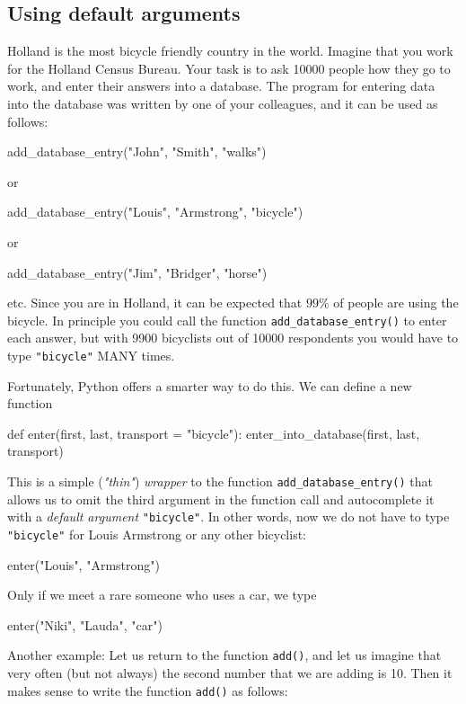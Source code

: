 \subsection{Using default arguments}

Holland is the most bicycle friendly country in the world. Imagine that you 
work for the Holland Census Bureau. Your task is to ask 10000 
people how they go to work, and enter their answers into a database. 
The program for entering data into the database was written by one of 
your colleagues, and it can be used as follows:

\begin{bluecode}
add_database_entry("John", "Smith", "walks")
\end{bluecode}
or 
\begin{bluecode}
add_database_entry("Louis", "Armstrong", "bicycle")
\end{bluecode}
or
\begin{bluecode}
add_database_entry("Jim", "Bridger", "horse")
\end{bluecode}
etc. Since you are in Holland, it can be expected that $99 \%$ of people 
are using the bicycle. In principle you could call the function {\tt add\_database\_entry()} 
to enter each answer, but with 9900 bicyclists out of 10000 respondents you would have to 
type {\tt "bicycle"} MANY times. 

Fortunately, Python offers a smarter way to do this. We can define a new function 

\begin{bluecode}
def enter(first, last, transport = "bicycle"):
    enter_into_database(first, last, transport)
\end{bluecode}
This is a simple ({\em "thin"}) {\em wrapper} to the function {\tt add\_database\_entry()} 
that allows us to omit the third argument in the function call and autocomplete 
it with a {\em default argument} {\tt "bicycle"}. In other words, now we do not have to 
type {\tt "bicycle"} for Louis Armstrong or any other bicyclist:

\begin{bluecode}
enter("Louis", "Armstrong")
\end{bluecode}
Only if we meet a rare someone who uses a car, we type 

\begin{bluecode}
enter("Niki", "Lauda", "car")
\end{bluecode}
Another example: Let us return to the function {\tt add()}, and let us 
imagine that very often (but not always) the second number that we
are adding is 10. Then it makes sense to write the function {\tt add()}
as follows:

